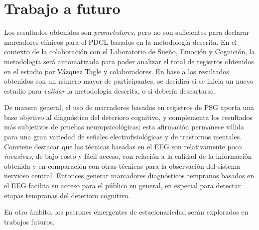 \documentclass[12pt,letterpaper]{book}
\begin{document}
\section{Trabajo a futuro}

Los resultados obtenidos son \textit{prometedores}, pero no son suficientes para declarar marcadores clínicos para el PDCL basados en la metodología descrita.
%
En el contexto de la colaboración con el Laboratorio de Sueño, Emoción y Cognición, la metodología será automatizada para poder analizar el total de registros obtenidos en el estudio por Vázquez Tagle y colaboradores.
%
En base a los resultados obtenidos con un número mayor de participantes, se decidirá si se inicia un nuevo estudio para \textit{validar} la metodología descrita, o si debería descartarse.

%
%

De manera general, el uso de marcadores basados en registros de PSG aporta una base objetivo al diagnóstico del deterioro cognitivo, y complementa los resultados más subjetivos de pruebas neuropsicológicas; esta afirmación permanece válida para una gran variedad de señales electrofisiológicas y de trastornos mentales.
%
Conviene destacar que las técnicas basadas en el EEG son relativamente poco \textit{invasivas}, de bajo costo y fácil acceso, con relación a la calidad de la información obtenida y en comparación con otras técnicas para la observación del sistema nervioso central.
%
Entonces generar marcadores diagnósticos tempranos basados en el EEG facilita su acceso para el público en general, en especial para detectar etapas tempranas del deterioro cognitivo.

En otro ámbito, los patrones emergentes de estacionariedad serán explorados en trabajos futuros.

\end{document}
